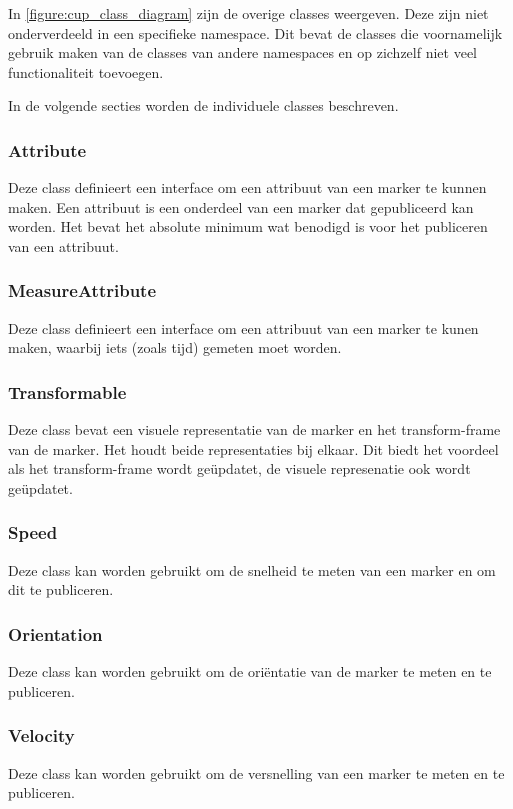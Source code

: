 \documentclass[11pt,titlepage]{article}
\begin{document}
In \autoref{figure:cup_class_diagram} zijn de overige classes weergeven. Deze zijn niet onderverdeeld in een specifieke namespace. Dit bevat de classes die voornamelijk gebruik maken van de classes van andere namespaces en op zichzelf niet veel functionaliteit toevoegen.

In de volgende secties worden de individuele classes beschreven.

\subsubsection{Attribute}
Deze class definieert een interface om een attribuut van een marker te kunnen maken. Een attribuut is een onderdeel van een marker dat gepubliceerd kan worden. Het bevat het absolute minimum wat benodigd is voor het publiceren van een attribuut.

\subsubsection{MeasureAttribute}
Deze class definieert een interface om een attribuut van een marker te kunen maken, waarbij iets (zoals tijd) gemeten moet worden.

\subsubsection{Transformable}
Deze class bevat een visuele representatie van de marker en het transform-frame van de marker. Het houdt beide representaties bij elkaar. Dit biedt het voordeel als het transform-frame wordt geüpdatet, de visuele represenatie ook wordt geüpdatet.

\subsubsection{Speed}
Deze class kan worden gebruikt om de snelheid te meten van een marker en om dit te publiceren.

\subsubsection{Orientation}
Deze class kan worden gebruikt om de oriëntatie van de marker te meten en te publiceren.

\subsubsection{Velocity}
Deze class kan worden gebruikt om de versnelling van een marker te meten en te publiceren.
\end{document}
